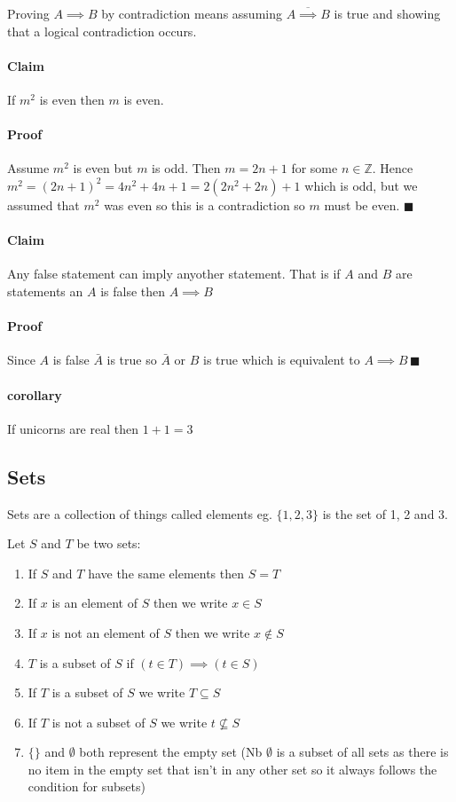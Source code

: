 \documentclass{article}
\begin{document}
Proving \(A\implies B\) by contradiction means assuming \(\overline{A\implies B}\) is true and showing that a logical contradiction occurs.

\paragraph{Claim} If \(m^2\) is even then \(m\) is even.

\paragraph{Proof} Assume \(m^2\) is even but \(m\) is odd. Then \(m=2n+1\) for some \(n\in\mathbb{Z}\). Hence \(m^2=(2n+1)^2=4n^2+4n+1=2(2n^2+2n)+1\) which is odd, but we assumed that \(m^2\) was even so this is a contradiction so \(m\) must be even. \(\blacksquare\)

\paragraph{Claim} Any false statement can imply anyother statement. That is if \(A\) and \(B\) are statements an \(A\) is false then \(A\implies B\)

\paragraph{Proof} Since \(A\) is false \(\bar A\) is true so \(\bar A \text{ or } B\) is true which is equivalent to \(A\implies B\,\blacksquare\)

\paragraph{corollary} If unicorns are real then \(1+1=3\)

\subsection*{Sets}

Sets are a collection of things called elements eg. \(\{1,2,3\}\) is the set of 1, 2 and 3.

Let \(S\) and \(T\) be two sets:

\begin{enumerate}
\item If \(S\) and \(T\) have the same elements then \(S=T\)
\item If \(x\) is an element of \(S\) then we write \(x\in S\)
\item If \(x\) is not an element of \(S\) then we write \(x\notin S\)
\item \(T\) is a subset of \(S\) if \((t\in T)\implies(t\in S)\)
\item If \(T\) is a subset of \(S\) we write \(T\subseteq S\)
\item If \(T\) is not a subset of \(S\) we write \(t\nsubseteq S\)
\item \(\{\}\) and \(\emptyset\) both represent the empty set (Nb \(\emptyset\) is a subset of all sets as there is no item in the empty set that isn't in any other set so it always follows the condition for subsets)
\end{enumerate}
\end{document}
